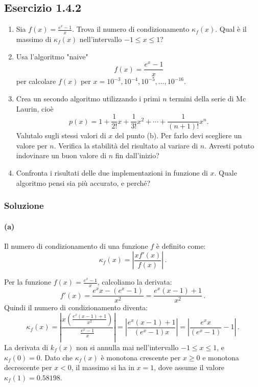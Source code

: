 \documentclass[letterpaper, 12pt]{article}
\numberwithin{equation}{section}    %
\begin{document}
\subsection{Esercizio 1.4.2}
\begin{enumerate}[label=(\alph*)]
    \item Sia $f(x) = \frac{e^x-1}{x}$. Trova il numero di condizionamento $\kappa_f(x)$. 
    Qual è il massimo di $\kappa_f(x)$ nell'intervallo $-1\le x \le 1$?
    \item Usa l'algoritmo "naive"
    \begin{equation}
        f(x)= \frac{e^x-1}{x}
        \label{eq:algoritmo_naive}
    \end{equation}
    per calcolare $f(x)$ per $x=10^{-3},10^{-4},10^{-5},\ldots,10^{-16}$.
    \item Crea un secondo algoritmo utilizzando i primi $n$ termini della serie di Mc Laurin, cioè
    \begin{equation}
        p(x) = 1 + \frac{1}{2!}x + \frac{1}{3!}x^2 + \cdots + \frac{1}{(n+1)!}x^n.
        \label{eq:algoritmo_maclaurin}
    \end{equation}
    Valutalo sugli stessi valori di $x$ del punto (b). Per farlo devi scegliere un valore per $n$. 
    Verifica la stabilità del risultato al variare di $n$. Avresti potuto indovinare un buon valore di $n$ 
    fin dall'inizio?
    \item Confronta i risultati delle due implementazioni in funzione di $x$. 
    Quale algoritmo pensi sia più accurato, e perché?
\end{enumerate}

\subsubsection{Soluzione}

\paragraph{(a)}Il numero di condizionamento di una funzione $f$ è definito come:
\begin{equation*}
    \kappa_f(x) = \left| \frac{x f'(x)}{f(x)} \right|\,.
\end{equation*}

Per la funzione $f(x) = \frac{e^x-1}{x}$, calcoliamo la derivata:
\begin{equation*}
    f'(x) = \frac{e^x x - (e^x - 1)}{x^2} = \frac{e^x (x-1) + 1}{x^2}\,.
\end{equation*}
Quindi il numero di condizionamento diventa:
\begin{equation*}
    \kappa_f(x) = \left| \frac{x \left( \frac{e^x (x-1) + 1}{x^2} \right)}{\frac{e^x - 1}{x}} \right| = \left| \frac{e^x (x-1) + 1}{(e^x - 1)x} \right| = \left| \frac{e^x x}{(e^x - 1)} - 1 \right|\,.
\end{equation*}
La derivata di $k_f(x)$ non si annulla mai nell'intervallo $-1 \leq x \leq 1$, e $\kappa_f(0) = 0$. Dato che
$\kappa_f(x)$ è monotona crescente per $x \geq 0$ e monotona decrescente per $x < 0$, il massimo si ha in $x = 1$,
dove assume il valore $\kappa_f(1) = 0.58198$.
\end{document}
